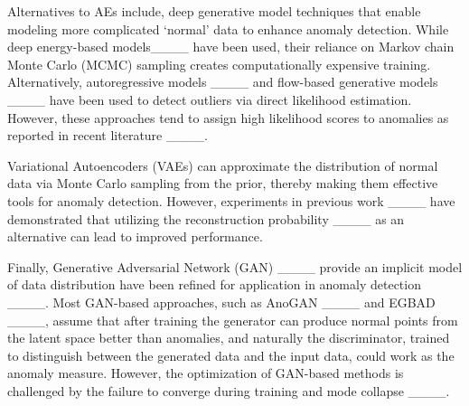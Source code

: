 Alternatives to AEs include, deep generative model techniques that enable modeling more complicated `normal' data to enhance anomaly detection. While deep energy-based models____ have been used, their reliance on Markov chain Monte Carlo (MCMC) sampling creates computationally expensive training. Alternatively, autoregressive models ____ and flow-based generative models ____ have been used to detect outliers 
via direct likelihood estimation. However, these approaches tend to assign high likelihood scores to anomalies as reported in recent literature ____.

Variational Autoencoders (VAEs) can approximate the distribution of normal data via Monte Carlo sampling from the prior, thereby making them effective tools for anomaly detection.  However, experiments in previous work ____ have demonstrated that utilizing the reconstruction probability ____ as an alternative can lead to improved performance.

Finally, Generative Adversarial Network (GAN) ____ provide an implicit model of data distribution have been refined for application in anomaly detection ____. Most GAN-based approaches, such as AnoGAN ____ and EGBAD ____, assume that after training the generator can produce normal points from the latent space better than anomalies, and naturally the discriminator, trained to distinguish  between the generated data and the input data, could work as the anomaly measure.  However, the optimization of GAN-based methods is challenged by the failure to converge during training and mode collapse ____.